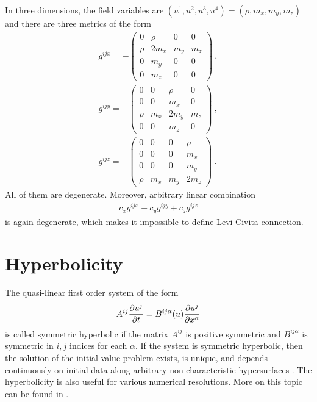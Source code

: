 \begin{example}
    In three dimensions, the field variables are $(u^1,u^2,u^3,u^4) = (\rho, m_x,m_y,m_z)$ and there are three metrics of the form
    \begin{align}
        g^{ij x} = -\begin{pmatrix}
            0 &  \rho & 0 & 0 \\
            \rho &  2 m_x &  m_y & m_z \\
            0 & m_y & 0 & 0 \\
            0 & m_z & 0 & 0
        \end{pmatrix}  \:, \\
        g^{ij y} = -\begin{pmatrix}
            0 & 0 & \rho & 0 \\
            0 & 0 & m_x & 0\\
            \rho & m_x & 2m_y & m_z \\
            0 & 0 & m_z & 0
        \end{pmatrix}  \:, \\
        g^{ij z} = -\begin{pmatrix}
            0 & 0 & 0 & \rho \\
            0 & 0 & 0 & m_x \\
            0 & 0 & 0 & m_y \\
            \rho & m_x & m_y & 2 m_z
        \end{pmatrix}  \:.
    \end{align}
    All of them are degenerate. Moreover, arbitrary linear combination
    \begin{align}
        c_x g^{ij x} + c_y g^{ij y} + c_z g^{ij z}
    \end{align}
    is again degenerate, which makes it impossible to define Levi-Civita connection.
\end{example}

\section{Hyperbolicity}

The quasi-linear first order system of the form
\begin{align}
    A^{ij} \frac{\partial u^j}{\partial t} = B^{ij \alpha}(u) \frac{\partial u^j}{\partial x^\alpha}
\end{align}
is called symmetric hyperbolic if the matrix $A^{ij}$ is positive symmetric and $B^{ij \alpha}$ is symmetric in $i,j$ indices for each $\alpha$. If the system is symmetric hyperbolic, then the solution of the initial value problem exists, is unique, and depends continuously on initial data along arbitrary non-characteristic hypersurfaces \cite{Pavelka}. The hyperbolicity is also useful for various numerical resolutions. More on this topic can be found in \cite{Toro}. 

